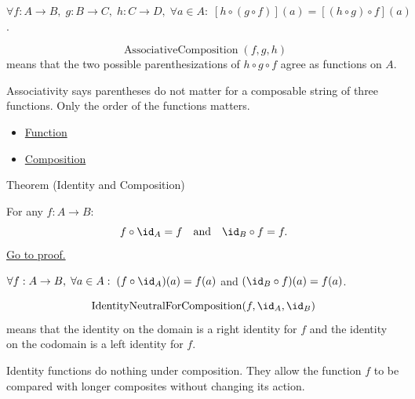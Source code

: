 \begin{remark*}
$\forall f\!:\!A\!\to\!B,\; g\!:\!B\!\to\!C,\; h\!:\!C\!\to\!D,\; \forall a \in A:\; [h \circ (g \circ f)](a) = [(h \circ g) \circ f](a)$.
\end{remark*}

\begin{remark*}
\[
  \operatorname{AssociativeComposition}(f,g,h)
\] means that the two possible
parenthesizations of $h\circ g\circ f$ agree as functions on $A$.
\end{remark*}

\begin{remark*}[Interpretation]
Associativity says parentheses do not matter for a composable string of three
functions. Only the order of the functions matters.
\end{remark*}

\begin{dependencies}
\begin{itemize}
  \item \hyperref[def:function]{Function}
  \item \hyperref[def:composition]{Composition}
\end{itemize}
\end{dependencies}

\begin{theorembox}{Theorem (Identity and Composition)}
\begin{theorem}\label{thm:comp-id}
For any $f : A \to B$:
\[
f \circ \id_A = f
\quad\text{and}\quad
\id_B \circ f = f.
\]
\hyperref[prf:comp-id]{Go to proof.}
\end{theorem}
\end{theorembox}

\begin{remark*}
$\forall f : A \to B,\; \forall a \in A:\; (f \circ \id_A)(a) = f(a)$ and $(\id_B \circ f)(a) = f(a)$.
\end{remark*}

\begin{remark*}
\[
  \operatorname{IdentityNeutralForComposition}(f,\id_A,\id_B)
\] means that the
identity on the domain is a right identity for $f$ and the identity on the
codomain is a left identity for $f$.
\end{remark*}

\begin{remark*}[Interpretation]
Identity functions do nothing under composition. They allow the function $f$ to
be compared with longer composites without changing its action.
\end{remark*}

